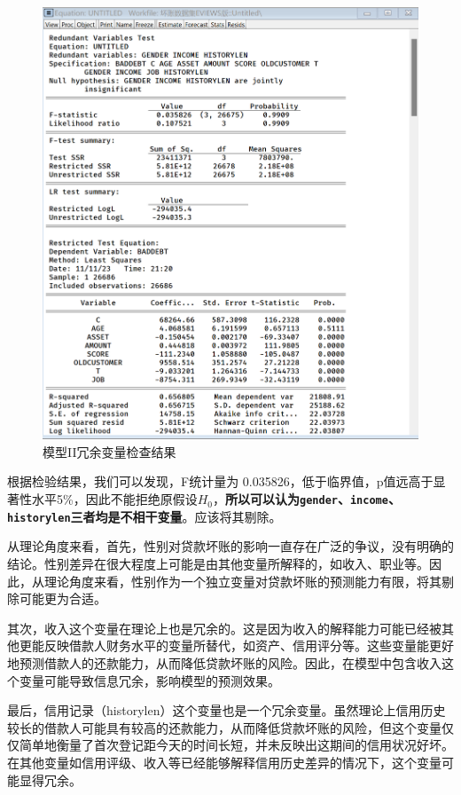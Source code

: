 \documentclass[13.5pt,hyperref,a4paper,UTF8]{ctexart}
\begin{document}
\begin{figure}[H]
    \centering
    \includegraphics[width=.9\linewidth]{figures//3回归//回归2/模型II冗余.png}
    \caption{模型II冗余变量检查结果}
    \label{gender、income、historylen是冗余变量.png}
\end{figure}

根据检验结果，我们可以发现，F统计量为 0.035826，低于临界值，p值远高于显著性水平5\%，因此不能拒绝原假设$H_0$，\textbf{所以可以认为\texttt{gender}、\texttt{income}、\texttt{historylen}三者均是不相干变量}。应该将其剔除。


从理论角度来看，首先，性别对贷款坏账的影响一直存在广泛的争议，没有明确的结论。性别差异在很大程度上可能是由其他变量所解释的，如收入、职业等。因此，从理论角度来看，性别作为一个独立变量对贷款坏账的预测能力有限，将其剔除可能更为合适。

其次，收入这个变量在理论上也是冗余的。这是因为收入的解释能力可能已经被其他更能反映借款人财务水平的变量所替代，如资产、信用评分等。这些变量能更好地预测借款人的还款能力，从而降低贷款坏账的风险。因此，在模型中包含收入这个变量可能导致信息冗余，影响模型的预测效果。

最后，信用记录（historylen）这个变量也是一个冗余变量。虽然理论上信用历史较长的借款人可能具有较高的还款能力，从而降低贷款坏账的风险，但这个变量仅仅简单地衡量了首次登记距今天的时间长短，并未反映出这期间的信用状况好坏。在其他变量如信用评级、收入等已经能够解释信用历史差异的情况下，这个变量可能显得冗余。
\end{document}
